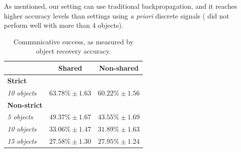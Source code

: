 \documentclass[11pt,a4paper]{article}
\newcommand{\nbEC}[1]{{\leavevmode\color{blue}{\scriptsize#1}}}
\newcommand{\nbSST}[1]{{\leavevmode\color{violet}{\scriptsize#1}}}
\begin{document}
As mentioned, our setting can use traditional backpropagation, and it reaches higher accuracy levels than settings using \emph{a priori} discrete signals (\citep{Steinert-Threlkeld2019} did not perform well with more than 4 objects\nbEC{CHECK}).
\nbEC{Move this paragraph to discussion section?}
\nbSST{I think we should remove this little paragraph: 6 objects was the highest I did, and mean accuracy was either 73\% or 69\%.  It's plausible that it would not be as good at 10+ objects, but we can't do a direct comparison.}


\begin{table}[]
\begin{tabular}{lcc}
\hline
                       & \textbf{Shared} & \textbf{Non-shared} \\ \hline
\textbf{Strict} & \\
\emph{10 objects} & 
	$63.78\%\pm 1.63$  & $60.22\%\pm 1.56$      \\\hline
\textbf{Non-strict} & \\
\emph{5 objects} &
	$49.37\%\pm 1.67$  & $43.55\%\pm 1.69$      \\
\emph{10 objects} &
	$33.06\%\pm 1.47$  & $31.89\%\pm 1.63$      \\
\emph{15 objects} &
	$27.58\%\pm 1.30$  & $27.95\%\pm 1.24$      \\ \hline
\end{tabular}
\caption{Communicative success, as measured by object recovery accuracy.}\label{tab:object_prediction_accuracy}
\end{table}

\end{document}

